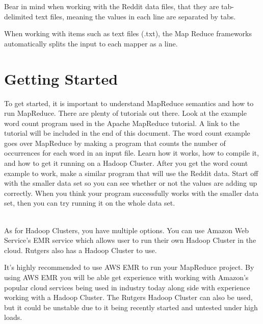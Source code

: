 \documentclass{article}
\begin{document}
\begin{info}
Bear in mind when working with the Reddit data files, that they are tab-delimited text files, meaning the values in each line are separated by tabs. 
\end{info}

\begin{info}
When working with items such as text files (.txt), the Map Reduce frameworks automatically splits the input to each mapper as a line. 
\end{info}


\section*{Getting Started}
To get started, it is important to understand MapReduce semantics and how to run MapReduce. There are plenty of tutorials out there. Look at the example word count program used in the Apache MapReduce tutorial. A link to the tutorial will be included in the end of this document. The word count example goes over MapReduce by making a program that counts the number of occurrences for each word in an input file. Learn how it works, how to compile it, and how to get it running on a Hadoop Cluster. After you get the word count example to work, make a similar program that will use the Reddit data. Start off with the smaller data set so you can see whether or not the values are adding up correctly. When you think your program successfully works with the smaller data set, then you can try running it on the whole data set. 

\-\ \\As for Hadoop Clusters, you have multiple options. You can use Amazon Web Service's EMR service which allows user to run their own Hadoop Cluster in the cloud. Rutgers also has a Hadoop Cluster to use.

\begin{info}
It's highly recommended to use AWS EMR to run your MapReduce project. By using AWS EMR you will be able get experience with working with Amazon's popular cloud services being used in industry today along side with experience working with a Hadoop Cluster. The Rutgers Hadoop Cluster can also be used, but it could be unstable due to it being recently started and untested under high loads.
\end{info}
\end{document}
